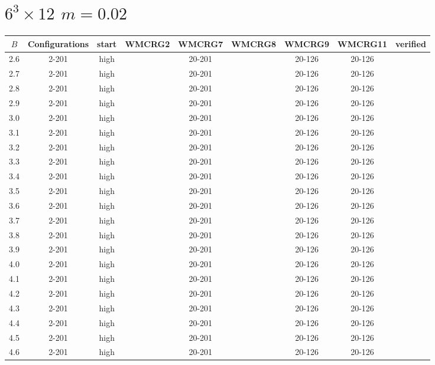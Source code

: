 \documentclass{article}
\begin{document}
  \section*{$6^3\times12$  $m=0.02$}
    \begin{center}
    \begin{tabular}{| c | c | c | c | c | c | c | c | c |}
      \hline
      $B$ & Configurations & start & WMCRG2 & WMCRG7 & WMCRG8 & WMCRG9 & WMCRG11 & verified\\
      \hline
      2.6 & 2-201 & high &  & 20-201 &  & 20-126 & 20-126 &\\
      2.7 & 2-201 & high &  & 20-201 &  & 20-126 & 20-126 &\\
      2.8 & 2-201 & high &  & 20-201 &  & 20-126 & 20-126 &\\
      2.9 & 2-201 & high &  & 20-201 &  & 20-126 & 20-126 &\\
      3.0 & 2-201 & high &  & 20-201 &  & 20-126 & 20-126 &\\
      3.1 & 2-201 & high &  & 20-201 &  & 20-126 & 20-126 &\\
      3.2 & 2-201 & high &  & 20-201 &  & 20-126 & 20-126 &\\
      3.3 & 2-201 & high &  & 20-201 &  & 20-126 & 20-126 &\\
      3.4 & 2-201 & high &  & 20-201 &  & 20-126 & 20-126 &\\
      3.5 & 2-201 & high &  & 20-201 &  & 20-126 & 20-126 &\\
      3.6 & 2-201 & high &  & 20-201 &  & 20-126 & 20-126 &\\
      3.7 & 2-201 & high &  & 20-201 &  & 20-126 & 20-126 &\\
      3.8 & 2-201 & high &  & 20-201 &  & 20-126 & 20-126 &\\
      3.9 & 2-201 & high &  & 20-201 &  & 20-126 & 20-126 &\\
      4.0 & 2-201 & high &  & 20-201 &  & 20-126 & 20-126 &\\
      4.1 & 2-201 & high &  & 20-201 &  & 20-126 & 20-126 &\\
      4.2 & 2-201 & high &  & 20-201 &  & 20-126 & 20-126 &\\
      4.3 & 2-201 & high &  & 20-201 &  & 20-126 & 20-126 &\\
      4.4 & 2-201 & high &  & 20-201 &  & 20-126 & 20-126 &\\
      4.5 & 2-201 & high &  & 20-201 &  & 20-126 & 20-126 &\\
      4.6 & 2-201 & high &  & 20-201 &  & 20-126 & 20-126 &\\

\end{tabular}
\end{center}
\end{document}
